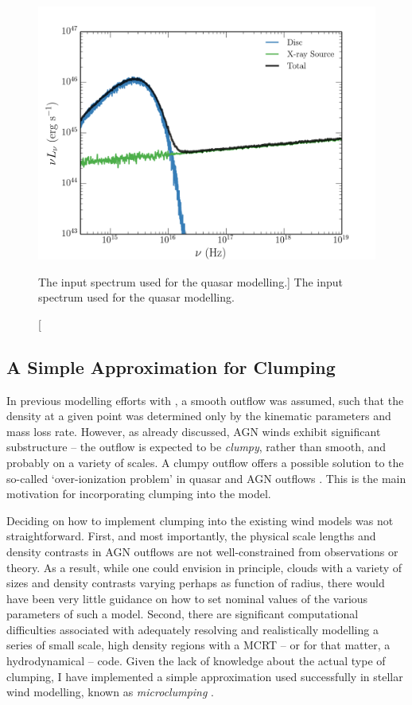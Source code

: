 \begin{figure} 
\centering
\includegraphics[width=1.0\textwidth]{figures/06-agnpaper/qso_model_sed.png}
\caption
[The input spectrum used for the quasar modelling.]
{
The input spectrum used for the quasar modelling.
}
\label{fig:qso_model_sed}
\end{figure} 

\subsection{A Simple Approximation for Clumping}

In previous modelling efforts with \py, a smooth outflow was assumed, 
such that the density at a given point was determined only by the 
kinematic parameters and mass loss rate. However, as already discussed,
AGN winds exhibit significant substructure -- the outflow is expected to be
{\em clumpy}, rather than smooth, and probably on a variety of scales. 
A clumpy outflow offers a possible solution to the so-called `over-ionization problem' in 
quasar and AGN outflows \citep[e.g.][]{junk1983,weymann1985,hamann2013}. 
This is the main motivation for incorporating clumping into the model.

Deciding on how to implement clumping into the existing wind models was not straightforward.
First, and most importantly, the physical scale lengths and density contrasts in AGN outflows are not well-constrained from observations or theory.  As a result, while one could envision in principle, clouds with a variety of sizes and density contrasts varying perhaps as function of radius, there would have been very little guidance on how to set nominal values of the various parameters of such a model.
Second, there are significant computational difficulties associated with adequately resolving and realistically modelling a series of small scale, high density regions with a MCRT
-- or for that matter, a hydrodynamical -- code. 
Given the lack of knowledge about the actual type of clumping, I have implemented
a simple approximation used successfully in stellar wind modelling, known as 
{\em microclumping} \citep[e.g.][]{hamann1998,hilliermiller1999,hamann2008}.  

